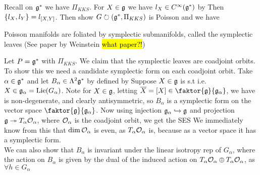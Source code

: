 \documentclass{article}
\begin{document}
\begin{ex}\label{ex:CQIS:KKSPoisson}
Recall on $\mf{g}^\ast$ we have $\Pi_{KKS}$. For $X \in \mf{g}$ we have $l_X \in C^\infty(\mf{g}^\ast)$ by 
Then $\acomm[l_X]{l_Y} = l_{\comm[X]{Y}}$. Then show $G \lact (\mf{g}^\ast, \Pi_{KKS})$ is Poisson and we have 
\end{ex}

\begin{fact}
Poisson manifolds are foliated by symplectic submanifolds, called the symplectic leaves (See paper by Weinstein \hl{what paper?!})
\end{fact}

\begin{example}\label{example:CQIS:CoadjointOrbitSymplectic}
Let $P = \mf{g}^\ast$ with $\Pi_{KKS}$. We claim that the symplectic leaves are coadjoint orbits. To show this we need a candidate symplectic form on each coadjoint orbit. Take $\alpha \in \mf{g}^\ast$ and let $B_\alpha \in \Lambda^2 \mf{g}^\ast$ by defined by 
Suppose $X \in \mf{g}$ is s.t 
i.e. $X \in \mf{g}_\alpha = \Lie(G_\alpha)$. Note for $X \in \mf{g}$, letting $\bar{X} = [X] \in \faktor{\mf{g}}{\mf{g}_\alpha}$, we have
is non-degenerate, and clearly antisymmetric, so $B_\alpha$ is a symplectic form on the vector space $\faktor{\mf{g}}{\mf{g}_\alpha}$. 
Now using injection $\mf{g}_\alpha \hookrightarrow \mf{g}$ and projection $\mf{g} \twoheadrightarrow T_\alpha \mc{O}_\alpha$, where $\mc{O}_\alpha$ is the coadjoint orbit, we get the SES
We immediately know from this that $\dim\mc{O}_\alpha$ is even, as $T_\alpha \mc{O}_\alpha$ is, because as a vector space it has a symplectic form. \\
We can also show that $B_\alpha$ is invariant under the linear isotropy rep of $G_\alpha$, where the action on $B_\alpha$ is given by the dual of the induced action on $T_\alpha \mc{O}_\alpha\oplus T_\alpha \mc{O}_\alpha$, as $\forall h \in G_\alpha$
\end{example}
\end{document}
